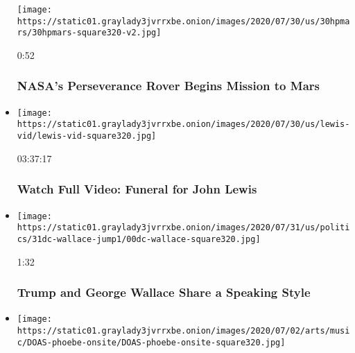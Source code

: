 \begin{itemize}
  \texttt{[image: https://static01.graylady3jvrrxbe.onion/images/2020/07/30/us/30hpmars/30hpmars-square320-v2.jpg]}

  0:52

  \hypertarget{nasas-perseverance-rover-begins-mission-to-mars}{%
  \subsubsection{NASA's Perseverance Rover Begins Mission to
  Mars}\label{nasas-perseverance-rover-begins-mission-to-mars}}
\item
  \href{https://www.nytimes3xbfgragh.onion/video/us/politics/100000007264379/john-lewis-funeral.html?action=click\&module=video-series-bar\&region=header\&pgtype=Article\&playlistId=video/latest-video}{}

  \texttt{[image: https://static01.graylady3jvrrxbe.onion/images/2020/07/30/us/lewis-vid/lewis-vid-square320.jpg]}

  03:37:17

  \hypertarget{watch-full-video-funeral-for-john-lewis}{%
  \subsubsection{Watch Full Video: Funeral for John
  Lewis}\label{watch-full-video-funeral-for-john-lewis}}
\item
  \href{https://www.nytimes3xbfgragh.onion/video/us/politics/100000007255898/trump-george-wallace-rhetoric.html?action=click\&module=video-series-bar\&region=header\&pgtype=Article\&playlistId=video/latest-video}{}

  \texttt{[image: https://static01.graylady3jvrrxbe.onion/images/2020/07/31/us/politics/31dc-wallace-jump1/00dc-wallace-square320.jpg]}

  1:32

  \hypertarget{trump-and-george-wallace-share-a-speaking-style}{%
  \subsubsection{Trump and George Wallace Share a Speaking
  Style}\label{trump-and-george-wallace-share-a-speaking-style}}
\item
  \href{https://www.nytimes3xbfgragh.onion/video/arts/music/100000007258359/phoebe-bridgers-kyoto.html?action=click\&module=video-series-bar\&region=header\&pgtype=Article\&playlistId=video/latest-video}{}

  \texttt{[image: https://static01.graylady3jvrrxbe.onion/images/2020/07/02/arts/music/DOAS-phoebe-onsite/DOAS-phoebe-onsite-square320.jpg]}


\end{itemize}
